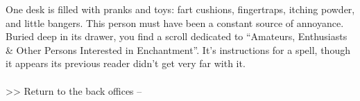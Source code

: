 One desk is filled with pranks and toys: fart cushions, fingertraps, itching powder, and little bangers. This person must have been a constant source of annoyance.\\

Buried deep in its drawer, you find a scroll dedicated to “Amateurs, Enthusiasts \& Other Persons Interested in Enchantment”. It’s instructions for a spell, though it appears its previous reader didn’t get very far with it.\\
\\

>> Return to the back offices -- 